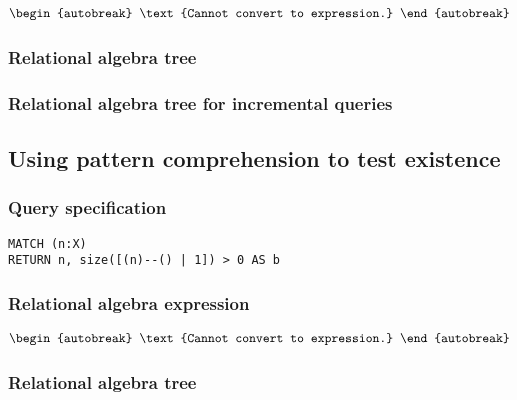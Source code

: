 \begin{align*}
\begin{autobreak}
\text{Cannot convert to expression.}
\end{autobreak}
\end{align*}

\subsubsection*{Relational algebra tree}


\subsubsection*{Relational algebra tree for incremental queries}


\subsection{Using pattern comprehension to test existence}

\subsubsection*{Query specification}

\begin{lstlisting}
MATCH (n:X)
RETURN n, size([(n)--() | 1]) > 0 AS b
\end{lstlisting}

\subsubsection*{Relational algebra expression}

\begin{align*}
\begin{autobreak}
\text{Cannot convert to expression.}
\end{autobreak}
\end{align*}

\subsubsection*{Relational algebra tree}


